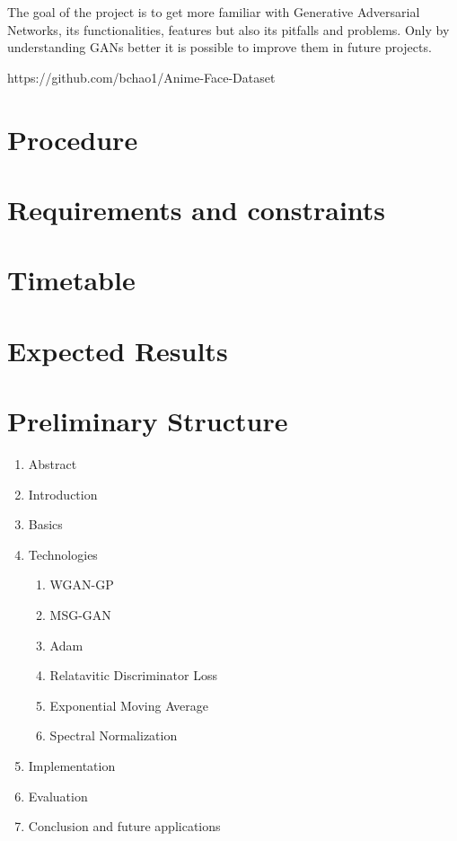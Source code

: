 \documentclass[conference,onecolumn,compsoc]{IEEEtran}
\begin{document}
\noindent
The goal of the project is to get more familiar with Generative Adversarial Networks, its functionalities, features but also its pitfalls and problems. Only by understanding GANs better it is possible to improve them in future projects.

https://github.com/bchao1/Anime-Face-Dataset


\section{Procedure}

\noindent
\blindtext

\section{Requirements and constraints}

\blindtext

\section{Timetable}

\noindent
\blindtext \cite{yazıcı2019unusual}

\section{Expected Results}

\noindent
\blindtext


\section{Preliminary  Structure}

\noindent
\begin{enumerate}
  \item Abstract
  \item Introduction
  \item Basics \cite{goodfellow2014generative}
  \item Technologies
  \begin{enumerate}
    \item WGAN-GP \cite{arjovsky2017wasserstein,gulrajani2017improved}
    \item MSG-GAN \cite{karnewar2020msggan}
    \item Adam \cite{kingma2017adam}
    \item Relatavitic Discriminator Loss \cite{jolicoeurmartineau2018relativistic}
    \item Exponential Moving Average \cite{yazıcı2019unusual}
    \item Spectral Normalization \cite{miyato2018spectral}
  \end{enumerate}
  \item Implementation
  \item Evaluation
  \item Conclusion and future applications
\end{enumerate}


\newpage


\printbibliography
\end{document}

